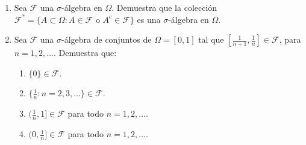 \documentclass{report}
\begin{document}
\begin{enumerate}
    \item Sea $\mathcal{F}$ una $\sigma$-álgebra en $\Omega$. Demuestra que la colección $\mathcal{F}^* = \{A \subset \Omega : A \in \mathcal{F} \text{ o } A^c \in \mathcal{F}\}$ es una $\sigma$-álgebra en $\Omega$.
    \item Sea $\mathcal{F}$ una $\sigma$-álgebra de conjuntos de $\Omega = [0,1]$ tal que $[\frac{1}{n+1},\frac{1}{n}]\in \mathcal{F}$, para $n=1, 2, \ldots$. Demuestra que:  
    \begin{enumerate}
        \item $\{0\} \in \mathcal{F}$.
        \item $\{\frac{1}{n}:n=2, 3,\ldots\} \in \mathcal{F}$.
        \item $(\frac{1}{n},1] \in \mathcal{F}$ para todo $n = 1,2,\ldots$.
        \item $(0,\frac{1}{n}] \in \mathcal{F}$ para todo $n = 1,2,\ldots$.
    \end{enumerate}
\end{enumerate}
\end{document}
